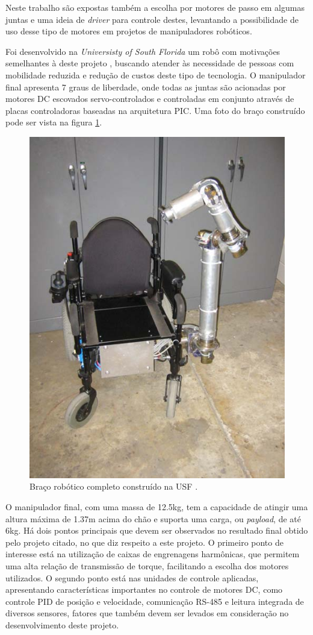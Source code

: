 Neste trabalho são expostas também a escolha por motores de passo em 
algumas juntas e uma ideia de \textit{driver} para controle destes, 
levantando a possibilidade de uso desse tipo de motores em projetos 
de manipuladores robóticos.

Foi desenvolvido na \textit{Universisty of South Florida} um robô com motivações semelhantes à deste projeto \cite{kevin2005WMRA}, buscando atender às 
necessidade de pessoas com mobilidade reduzida e redução de custos deste tipo de tecnologia. O manipulador final apresenta 7 graus de liberdade, onde todas as
juntas são acionadas por motores DC escovados servo-controlados e controladas em conjunto através de placas 
controladoras baseadas na arquitetura PIC.
Uma foto do braço construído pode ser vista na figura \ref{fig:wmra-usf}.

\begin{figure}[ht]
\caption{Braço robótico completo construído na USF \cite{kevin2005WMRA}.}    
\begin{centering}
\includegraphics[width=0.5\columnwidth]{images/fundamentos/wmra-usf.png}
\par\end{centering}

\label{fig:wmra-usf}
\end{figure}

O manipulador final, com uma massa de 12.5kg, tem a capacidade de atingir uma altura máxima de 1.37m acima do chão e suporta uma carga, ou \textit{payload}, de até
6kg. Há dois pontos principais que devem ser observados no resultado final obtido pelo 
projeto citado, no que diz respeito a este projeto. 
O primeiro ponto de interesse está na utilização de caixas de engrenagens
harmônicas, que permitem uma alta relação de transmissão de torque, facilitando
a escolha dos motores utilizados.
O segundo ponto está nas unidades de controle aplicadas, apresentando 
características importantes no controle de motores DC, como controle PID
de posição e velocidade, comunicação RS-485 e leitura integrada de diversos
sensores, fatores que também devem ser levados em consideração no desenvolvimento
deste projeto.


